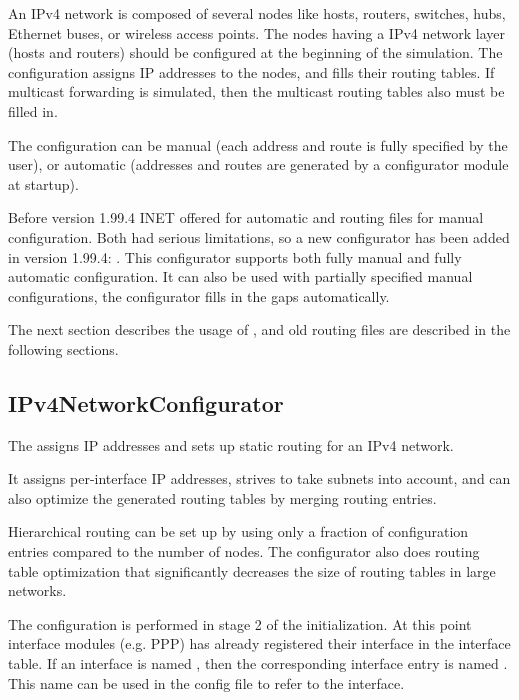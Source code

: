 An IPv4 network is composed of several nodes like hosts, routers,
switches, hubs, Ethernet buses, or wireless access points.
The nodes having a IPv4 network layer (hosts and routers) should be
configured at the beginning of the simulation. The configuration
assigns IP addresses to the nodes, and fills their routing tables.
If multicast forwarding is simulated, then the multicast routing
tables also must be filled in.


The configuration can be manual (each address and route is fully specified
by the user), or automatic (addresses and routes are generated by
a configurator module at startup).

Before version 1.99.4 INET offered 
for automatic and routing files for manual configuration.
Both had serious limitations, so a new configurator has been added
in version 1.99.4: . This configurator
supports both fully manual and fully automatic configuration. It
can also be used with partially specified manual configurations,
the configurator fills in the gaps automatically.

The next section describes the usage of ,
 and old routing files are described
in the following sections.

\subsection{IPv4NetworkConfigurator}
\label{subsec:ipv4configurator}

The  assigns IP addresses and sets up
static routing for an IPv4 network.

It assigns per-interface IP addresses, strives to take subnets into account,
and can also optimize the generated routing tables by merging routing entries.

Hierarchical routing can be set up by using only a fraction of configuration
entries compared to the number of nodes. The configurator also does
routing table optimization that significantly decreases the size of routing
tables in large networks.

The configuration is performed in stage 2 of the initialization. At this
point interface modules (e.g. PPP) has already registered their interface
in the interface table. If an interface is named , then the
corresponding interface entry is named . This name can be used
in the config file to refer to the interface.

